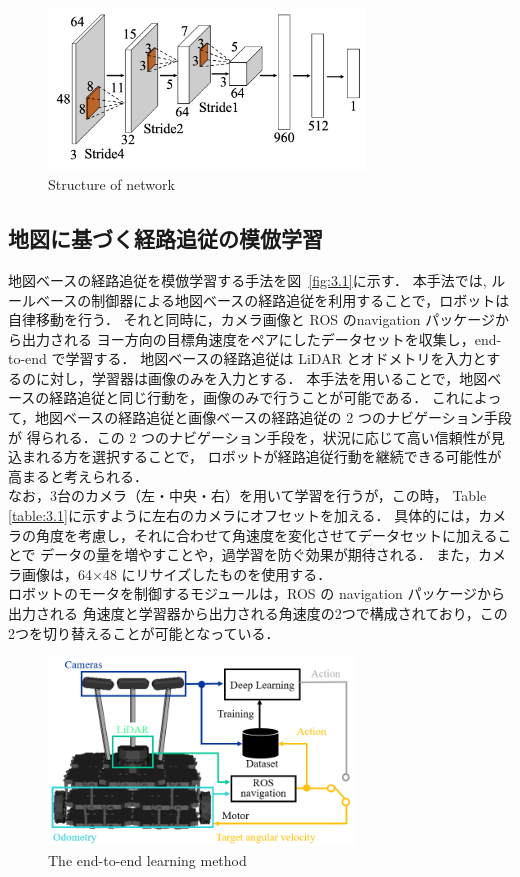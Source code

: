 \documentclass{jarticle}
\renewcommand{\figurename}{図~}
\newcommand{\figref}[1]{\figurename\ref{#1}}
\begin{document}
\begin{figure}[h!]
  \centering
   \includegraphics[height=43mm]{pdf/network.pdf}
   \caption{Structure of network}
   \label{fig:2}
\end{figure}


\subsection{地図に基づく経路追従の模倣学習}
地図ベースの経路追従を模倣学習する手法を\figref{fig:3.1}に示す．
本手法では, ルールベースの制御器による地図ベースの経路追従を利用することで，ロボットは自律移動を行う．
それと同時に，カメラ画像と ROS のnavigation パッケージから出力される
ヨー方向の目標角速度をペアにしたデータセットを収集し，end-to-end で学習する．
地図ベースの経路追従は LiDAR とオドメトリを入力とするのに対し，学習器は画像のみを入力とする．
本手法を用いることで，地図ベースの経路追従と同じ行動を，画像のみで行うことが可能である．
これによって，地図ベースの経路追従と画像ベースの経路追従の 2 つのナビゲーション手段が
得られる．この 2 つのナビゲーション手段を，状況に応じて高い信頼性が見込まれる方を選択することで，
ロボットが経路追従行動を継続できる可能性が高まると考えられる．\\
なお，3台のカメラ（左・中央・右）を用いて学習を行うが，この時， 
Table \ref{table:3.1}に示すように左右のカメラにオフセットを加える．
具体的には，カメラの角度を考慮し，それに合わせて角速度を変化させてデータセットに加えることで
データの量を増やすことや，過学習を防ぐ効果が期待される．
また，カメラ画像は，64×48 にリサイズしたものを使用する．\\
\hspace*{1zw}ロボットのモータを制御するモジュールは，ROS の navigation パッケージから出力される
角速度と学習器から出力される角速度の2つで構成されており，この2つを切り替えることが可能となっている．

\begin{figure}[h!]
  \centering
   \includegraphics[height=50mm]{./png/learn.png}
   \caption{The end-to-end learning method}
\end{figure}
\end{document}
